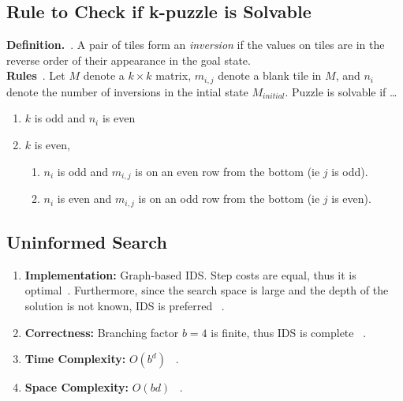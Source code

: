 \documentclass[runningheads]{llncs}
\begin{document}
\subsection{Rule to Check if k-puzzle is Solvable}
\textbf{Definition.}~\cite{aditya_goel_how_nodate}. A pair of tiles form an \textit{inversion} if the values on tiles are in the reverse order of their appearance in the goal state. \\
\textbf{Rules}~\cite{aditya_goel_how_nodate}. Let \( M \) denote a \( k \times k \) matrix, \( m_{i, j} \) denote a blank tile in \( M \), and \( n_i \) denote the number of inversions in the intial state \( M_{initial} \). Puzzle is solvable if \dots
\begin{enumerate}
    \item \( k \) is odd and \( n_i \) is even
    \item \( k \) is even,
    \begin{enumerate}
        \item \( n_i \) is odd and \( m_{i,j} \) is on an even row from the bottom (ie \( j \) is odd).
        \item \( n_i \) is even and \( m_{i,j} \) is on an odd row from the bottom (ie \( j \) is even).
    \end{enumerate}
\end{enumerate}

\subsection{Uninformed Search}
\begin{enumerate}
    \item \textbf{Implementation:} Graph-based IDS. Step costs are equal, thus it is optimal~\cite[p88]{stuart_russell_artifical_2010}. Furthermore, since the search space is large and the depth of the solution is not known, IDS is preferred ~\cite[p90]{stuart_russell_artifical_2010}.
    \item \textbf{Correctness:} Branching factor \( b = 4 \) is finite, thus IDS is complete ~\cite[p88-90]{stuart_russell_artifical_2010}. 
    \item \textbf{Time Complexity:} \( O(b^d) \) ~\cite[p88-90]{stuart_russell_artifical_2010}.
    \item \textbf{Space Complexity:} \( O(bd) \) ~\cite[p88-90]{stuart_russell_artifical_2010}.
\end{enumerate}

\end{document}

